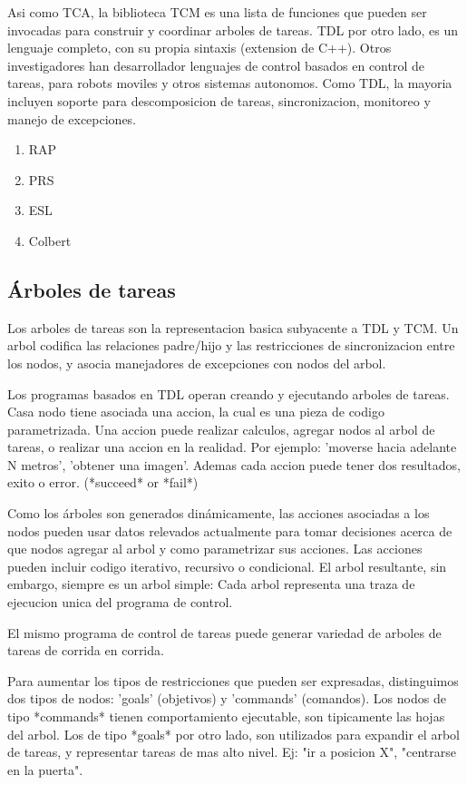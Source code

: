 Asi como TCA, la biblioteca TCM es una lista de funciones que pueden ser 
invocadas para construir y coordinar arboles de tareas.
TDL por otro lado, es un lenguaje completo, con su propia sintaxis 
(extension de C++).
Otros investigadores han desarrollador lenguajes de control basados en 
control de tareas, para robots moviles y otros sistemas autonomos.
Como TDL, la mayoria incluyen soporte para descomposicion de tareas, 
sincronizacion, monitoreo y manejo de excepciones.

\begin{enumerate}
\item RAP
\item PRS
\item ESL
\item Colbert
\end{enumerate}

\subsection{Árboles de tareas}

Los arboles de tareas son la representacion basica subyacente a TDL y TCM. 
Un arbol codifica las relaciones padre/hijo y
las restricciones de sincronizacion entre los nodos, y asocia manejadores 
de excepciones con nodos del arbol.

Los programas basados en TDL operan creando y ejecutando arboles de tareas. 
Casa nodo tiene asociada una accion, la cual es una pieza de codigo 
parametrizada.
Una accion puede realizar calculos, agregar nodos al arbol de tareas, o 
realizar una accion en la realidad. Por
ejemplo: 'moverse hacia adelante N metros', 'obtener una imagen'. 
Ademas cada accion puede tener dos resultados, exito o error.
(*succeed* or *fail*)

Como los árboles son generados dinámicamente, las acciones asociadas a los 
nodos pueden usar datos relevados actualmente
para tomar decisiones acerca de que nodos agregar al arbol y como 
parametrizar sus acciones.
Las acciones pueden incluir codigo iterativo, recursivo o condicional.
El arbol resultante, sin embargo, siempre es un arbol simple: Cada arbol 
representa una traza de ejecucion unica del programa de control.

El mismo programa de control de tareas puede generar variedad de arboles de 
tareas de corrida en corrida.

Para aumentar los tipos de restricciones que pueden ser expresadas, 
distinguimos dos tipos de nodos: 'goals' (objetivos) y 'commands' (comandos).
Los nodos de tipo *commands* tienen comportamiento ejecutable, son tipicamente
 las hojas del arbol.
Los de tipo *goals* por otro lado, son utilizados para expandir el arbol de 
tareas, y representar tareas de mas alto nivel. 
Ej: "ir a posicion X", "centrarse en la puerta".

